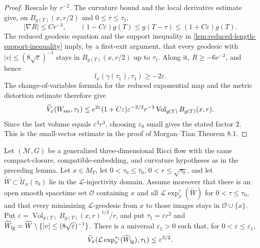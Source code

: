 \begin{proof}
Rescale by $r^{-2}$.  The curvature bound and the local derivative estimate
give, on $B_{g(T)}(x,r/2)$ and $0\le\tau\le\tau_1$,
\[
 |\nabla R|\le C r^{-3},\qquad
 (1-C\varepsilon)g(T)\le g(T-\tau)\le(1+C\varepsilon)g(T).
\]
The reduced geodesic equation and the support inequality in
\ref{lem:reduced-length-support-inequality} imply, by a first-exit argument,
that every geodesic with $|v|\le(8\sqrt\varepsilon)^{-1}$ stays in
$B_{g(T)}(x,r/2)$ up to $\tau_1$.  Along it, $R\ge-6r^{-2}$, and hence
\[
 l_x(\gamma(\tau_1),\tau_1)\ge-2\varepsilon.
\]
The change-of-variables formula for the reduced exponential map and the
metric distortion estimate therefore give
\[
 \widetilde V_x(W_{\rm sm},\tau_1)
 \le e^{2\varepsilon}(1+C\varepsilon)\varepsilon^{-3/2}r^{-3}
       \operatorname{Vol}_{g(T)}B_{g(T)}(x,r).
\]
Since the last volume equals $\varepsilon^3r^3$, choosing
$\varepsilon_0$ small gives the stated factor $2$.  This is the small-vector
estimate in the proof of Morgan--Tian Theorem 8.1.
\end{proof}

\begin{lemma}
\label{lem:generalized-noncollapsing-large-tail}
\notready
Let $(\mathcal M,G)$ be a generalized three-dimensional Ricci flow with
the same compact-closure, compatible-embedding, and curvature hypotheses
as in the preceding lemma.  Let $x\in M_T$, let
$0<\tau_0\le\bar\tau_0$, $0<r\le\sqrt{\tau_0}$, and let
$\widetilde W\subset\widetilde{\mathcal U}_x(\tau_0)$ lie in the
$\mathcal L$-injectivity domain.  Assume moreover that there is an open
smooth spacetime set $\mathcal O$ containing $x$ and all
$\mathcal L\exp_x^\tau(\widetilde W)$ for $0<\tau\le\tau_0$, and that every
minimizing $\mathcal L$-geodesic from $x$ to those images stays in
$\mathcal O\cup\{x\}$.  Put
$\displaystyle \varepsilon=\operatorname{Vol}_{g(T)}B_{g(T)}(x,r)^{1/3}/r$,
and put
$\tau_1=\varepsilon r^2$ and
$\widetilde W_{\rm lg}=
\widetilde W\setminus\{|v|\le(8\sqrt\varepsilon)^{-1}\}$.  There is a
universal $\varepsilon_1>0$ such that, for
$0<\varepsilon\le\varepsilon_1$,
\[
 \widetilde V_x(\mathcal L\exp_x^{\tau_1}(\widetilde W_{\rm lg}),\tau_1)
 \le \varepsilon^{3/2}.
\]
\end{lemma}

